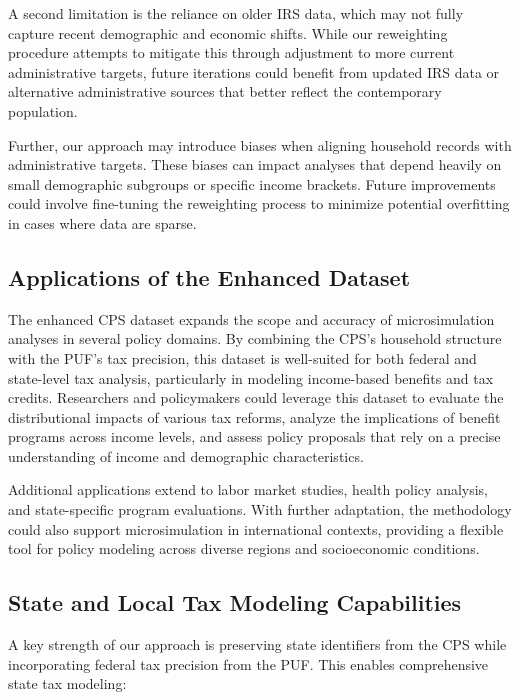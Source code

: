 A second limitation is the reliance on older IRS data, which may not fully capture recent demographic and economic shifts. While our reweighting procedure attempts to mitigate this through adjustment to more current administrative targets, future iterations could benefit from updated IRS data or alternative administrative sources that better reflect the contemporary population.

Further, our approach may introduce biases when aligning household records with administrative targets. These biases can impact analyses that depend heavily on small demographic subgroups or specific income brackets. Future improvements could involve fine-tuning the reweighting process to minimize potential overfitting in cases where data are sparse.

\subsection{Applications of the Enhanced Dataset}

The enhanced CPS dataset expands the scope and accuracy of microsimulation analyses in several policy domains. By combining the CPS's household structure with the PUF's tax precision, this dataset is well-suited for both federal and state-level tax analysis, particularly in modeling income-based benefits and tax credits. Researchers and policymakers could leverage this dataset to evaluate the distributional impacts of various tax reforms, analyze the implications of benefit programs across income levels, and assess policy proposals that rely on a precise understanding of income and demographic characteristics.

Additional applications extend to labor market studies, health policy analysis, and state-specific program evaluations. With further adaptation, the methodology could also support microsimulation in international contexts, providing a flexible tool for policy modeling across diverse regions and socioeconomic conditions.

\subsection{State and Local Tax Modeling Capabilities}

A key strength of our approach is preserving state identifiers from the CPS while incorporating federal tax precision from the PUF. This enables comprehensive state tax modeling:


